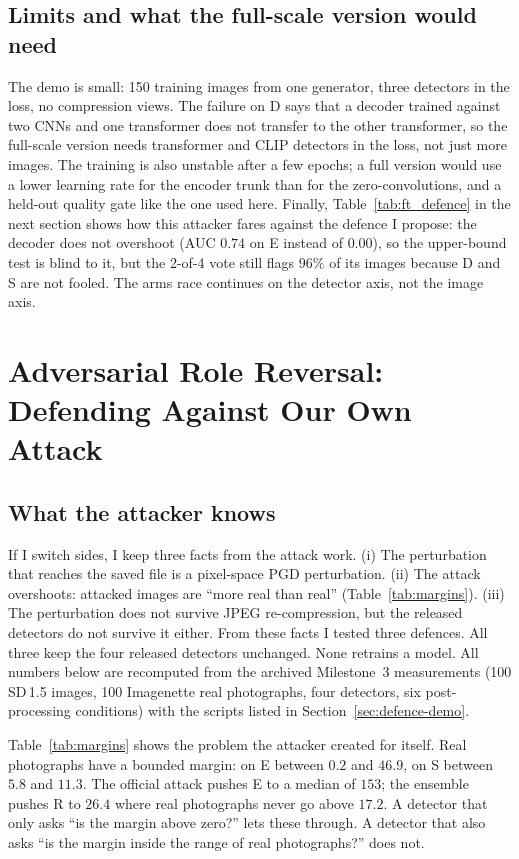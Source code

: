 \documentclass[journal]{IEEEtran}
\begin{document}
\subsection{Limits and what the full-scale version would need}
The demo is small: 150 training images from one generator, three detectors in the loss, no compression views. The failure on D says that a decoder trained against two CNNs and one transformer does not transfer to the other transformer, so the full-scale version needs transformer and CLIP detectors in the loss, not just more images. The training is also unstable after a few epochs; a full version would use a lower learning rate for the encoder trunk than for the zero-convolutions, and a held-out quality gate like the one used here. Finally, Table~\ref{tab:ft_defence} in the next section shows how this attacker fares against the defence I propose: the decoder does not overshoot (AUC $0.74$ on E instead of $0.00$), so the upper-bound test is blind to it, but the 2-of-4 vote still flags $96\%$ of its images because D and S are not fooled. The arms race continues on the detector axis, not the image axis.

\section{Adversarial Role Reversal: Defending Against Our Own Attack}
\label{sec:defence}

\subsection{What the attacker knows}
\label{sec:defence-know}

If I switch sides, I keep three facts from the attack work. (i) The perturbation that reaches the saved file is a pixel-space PGD perturbation. (ii) The attack overshoots: attacked images are ``more real than real'' (Table~\ref{tab:margins}). (iii) The perturbation does not survive JPEG re-compression, but the released detectors do not survive it either. From these facts I tested three defences. All three keep the four released detectors unchanged. None retrains a model. All numbers below are recomputed from the archived Milestone~3 measurements (100 SD\,1.5 images, 100 Imagenette real photographs, four detectors, six post-processing conditions) with the scripts listed in Section~\ref{sec:defence-demo}.

Table~\ref{tab:margins} shows the problem the attacker created for itself. Real photographs have a bounded margin: on E between $0.2$ and $46.9$, on S between $5.8$ and $11.3$. The official attack pushes E to a median of $153$; the ensemble pushes R to $26.4$ where real photographs never go above $17.2$. A detector that only asks ``is the margin above zero?'' lets these through. A detector that also asks ``is the margin inside the range of real photographs?'' does not.
\end{document}
